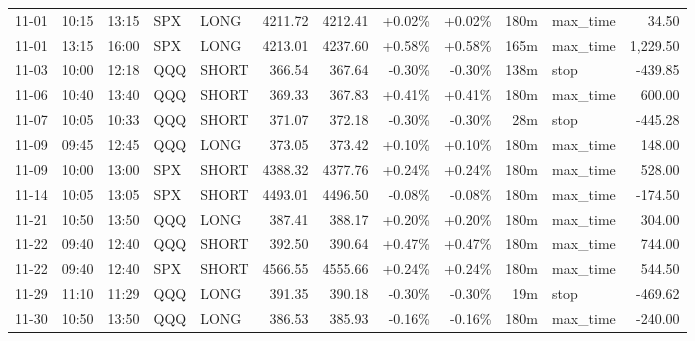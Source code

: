 \documentclass[11pt,a4paper,twoside]{article}
\begin{document}
\begin{center}
\begin{longtable}{>{\color{txtmain}}l l l l l r r r r r >{\color{txtmain}}l r}
11-01 & 10:15 & 13:15 & SPX & LONG & 4211.72 & 4212.41 & \textcolor{wingreen}{+0.02\%} & \textcolor{wingreen}{+0.02\%} & 180m & max\_time & \textcolor{wingreen}{34.50} \\
11-01 & 13:15 & 16:00 & SPX & LONG & 4213.01 & 4237.60 & \textcolor{wingreen}{+0.58\%} & \textcolor{wingreen}{+0.58\%} & 165m & max\_time & \textcolor{wingreen}{1,229.50} \\
11-03 & 10:00 & 12:18 & QQQ & SHORT & 366.54 & 367.64 & \textcolor{lossred}{-0.30\%} & \textcolor{lossred}{-0.30\%} & 138m & stop & \textcolor{lossred}{-439.85} \\
11-06 & 10:40 & 13:40 & QQQ & SHORT & 369.33 & 367.83 & \textcolor{wingreen}{+0.41\%} & \textcolor{wingreen}{+0.41\%} & 180m & max\_time & \textcolor{wingreen}{600.00} \\
11-07 & 10:05 & 10:33 & QQQ & SHORT & 371.07 & 372.18 & \textcolor{lossred}{-0.30\%} & \textcolor{lossred}{-0.30\%} & 28m & stop & \textcolor{lossred}{-445.28} \\
11-09 & 09:45 & 12:45 & QQQ & LONG & 373.05 & 373.42 & \textcolor{wingreen}{+0.10\%} & \textcolor{wingreen}{+0.10\%} & 180m & max\_time & \textcolor{wingreen}{148.00} \\
11-09 & 10:00 & 13:00 & SPX & SHORT & 4388.32 & 4377.76 & \textcolor{wingreen}{+0.24\%} & \textcolor{wingreen}{+0.24\%} & 180m & max\_time & \textcolor{wingreen}{528.00} \\
11-14 & 10:05 & 13:05 & SPX & SHORT & 4493.01 & 4496.50 & \textcolor{lossred}{-0.08\%} & \textcolor{lossred}{-0.08\%} & 180m & max\_time & \textcolor{lossred}{-174.50} \\
11-21 & 10:50 & 13:50 & QQQ & LONG & 387.41 & 388.17 & \textcolor{wingreen}{+0.20\%} & \textcolor{wingreen}{+0.20\%} & 180m & max\_time & \textcolor{wingreen}{304.00} \\
11-22 & 09:40 & 12:40 & QQQ & SHORT & 392.50 & 390.64 & \textcolor{wingreen}{+0.47\%} & \textcolor{wingreen}{+0.47\%} & 180m & max\_time & \textcolor{wingreen}{744.00} \\
11-22 & 09:40 & 12:40 & SPX & SHORT & 4566.55 & 4555.66 & \textcolor{wingreen}{+0.24\%} & \textcolor{wingreen}{+0.24\%} & 180m & max\_time & \textcolor{wingreen}{544.50} \\
11-29 & 11:10 & 11:29 & QQQ & LONG & 391.35 & 390.18 & \textcolor{lossred}{-0.30\%} & \textcolor{lossred}{-0.30\%} & 19m & stop & \textcolor{lossred}{-469.62} \\
11-30 & 10:50 & 13:50 & QQQ & LONG & 386.53 & 385.93 & \textcolor{lossred}{-0.16\%} & \textcolor{lossred}{-0.16\%} & 180m & max\_time & \textcolor{lossred}{-240.00} \\

\end{longtable}
\end{center}
\end{document}
